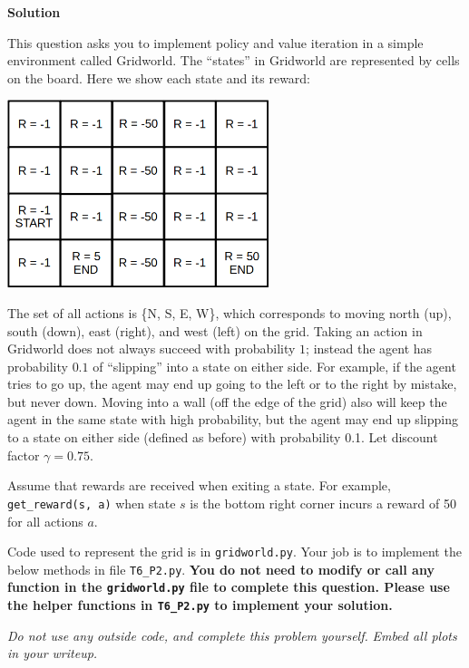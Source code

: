 \documentclass[submit]{harvardml}
\begin{document}
\textbf{Solution}


\begin{problem}

This question asks you to implement policy and value iteration in a simple environment called Gridworld.  The ``states'' in Gridworld are represented by cells on the board.  Here we show each state and its reward:

\begin{center}
\includegraphics[width=3in]{gridworld.png}
\end{center}

The set of all actions is \{N, S, E, W\}, which corresponds to moving north (up), south (down), east (right), and west (left) on the grid.  Taking an action in Gridworld does not always succeed with probability $1$; instead the agent has probability $0.1$ of ``slipping'' into a state on either side.  For example, if the agent tries to go up, the agent may end up going to the left or to the right by mistake, but never down.  Moving into a wall (off the edge of the grid) also will keep the agent in the same state with high probability, but the agent may end up slipping to a state on either side (defined as before) with probability 0.1.  Let discount factor $\gamma = 0.75$.

Assume that rewards are received when exiting a state.  For example, \texttt{get\_reward(s, a)} when state $s$ is the bottom right corner incurs a reward of 50 for all actions $a$.

Code used to represent the grid is in \texttt{gridworld.py}.  Your job is to implement the below methods in file \texttt{T6\_P2.py}. \textbf{You do not need to modify or call any function in the \texttt{gridworld.py} file to complete this question.  Please use the helper functions in \texttt{T6\_P2.py} to implement your solution.}

\emph{Do not use any outside code, and complete this problem yourself.}
\emph{Embed all plots in your writeup.}
  

\end{problem}
\end{document}
